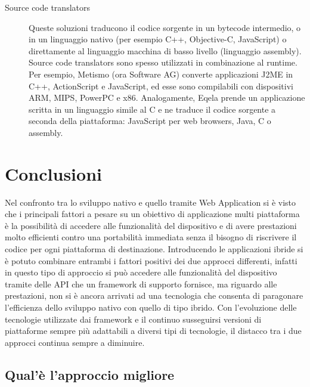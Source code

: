 \begin{description}
\item[Source code translators]
Queste soluzioni traducono il codice sorgente in un bytecode intermedio, o in un linguaggio nativo (per esempio C++, Objective-C, JavaScript) o direttamente al linguaggio macchina di basso livello (linguaggio assembly). Source code translators sono spesso utilizzati in combinazione al runtime. Per esempio, Metismo (ora Software AG) converte applicazioni J2ME in C++, ActionScript e JavaScript, ed esse sono compilabili con dispositivi ARM, MIPS, PowerPC e x86. Analogamente, Eqela prende un applicazione scritta in un linguaggio simile al C e ne traduce il codice sorgente a seconda della piattaforma: JavaScript per web browsers, Java, C o assembly. 
\end{description}


\section{Conclusioni}

Nel confronto tra lo sviluppo nativo e quello tramite Web Application si è visto che i principali fattori a pesare su un obiettivo di applicazione multi piattaforma è la possibilità di accedere alle funzionalità del dispositivo e di avere prestazioni molto efficienti contro una portabilità immediata senza il bisogno di riscrivere il codice per ogni piattaforma di destinazione. 
Introducendo le applicazioni ibride si è potuto combinare entrambi i fattori positivi dei due approcci differenti, infatti in questo tipo di approccio si può accedere alle funzionalità del dispositivo tramite delle API che un framework di supporto fornisce, ma riguardo alle prestazioni, non si è ancora arrivati ad una tecnologia che consenta di paragonare l'efficienza dello sviluppo nativo con quello di tipo ibrido. Con l'evoluzione delle tecnologie utilizzate dai framework e il continuo susseguirsi versioni di piattaforme sempre più adattabili a diversi tipi di tecnologie, il distacco tra i due approcci continua sempre a diminuire.

\subsection{Qual'è l'approccio migliore}


